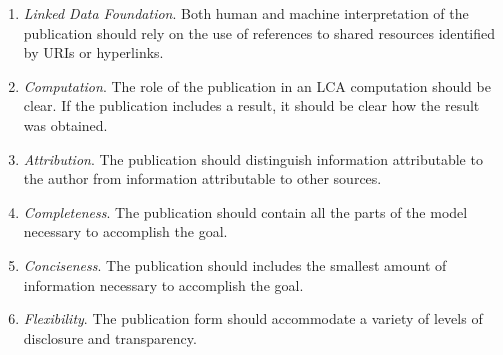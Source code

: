 \begin{enumerate}
\item \emph{Linked Data Foundation}.  Both human and machine interpretation of the publication should rely on the use of references to shared resources identified by URIs or hyperlinks.
\item \emph{Computation}.  The role of the publication in an LCA computation should be clear.  If the publication includes a result, it should be clear how the result was obtained.
\item \emph{Attribution}.  The publication should distinguish information attributable to the author from information attributable to other sources.
\item \emph{Completeness}.  The publication should contain all the parts of the model necessary to accomplish the goal.  
\item \emph{Conciseness}.  The publication should includes the smallest amount of information necessary to accomplish the goal.
\item \emph{Flexibility}.  The publication form should accommodate a variety of levels of disclosure and transparency.
\end{enumerate}
